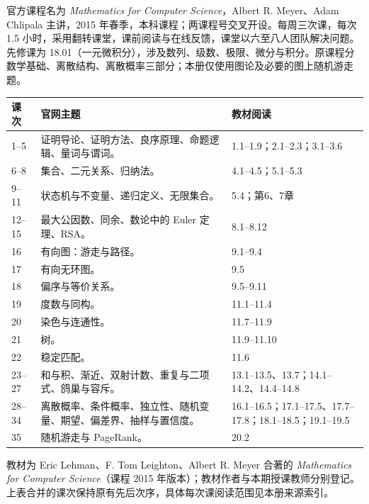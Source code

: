 \par\addvspace{9pt}\par\nobreak\vspace{4pt}
官方课程名为 \textit{Mathematics for Computer Science}，Albert R. Meyer、Adam Chlipala 主讲，2015 年春季，本科课程；两课程号交叉开设。每周三次课，每次 1.5 小时，采用翻转课堂，课前阅读与在线反馈，课堂以六至八人团队解决问题。先修课为 18.01（一元微积分），涉及数列、级数、极限、微分与积分。原课程分数学基础、离散结构、离散概率三部分；本册仅使用图论及必要的图上随机游走题。
\begin{longtable}{p{}p{}p{}}
\toprule 课次 & 官网主题 & 教材阅读\\\midrule\endhead
1--5 & 证明导论、证明方法、良序原理、命题逻辑、量词与谓词。 & 1.1--1.9；2.1--2.3；3.1--3.6\\
6--8 & 集合、二元关系、归纳法。 & 4.1--4.5；5.1--5.3\\
9--11 & 状态机与不变量、递归定义、无限集合。 & 5.4；第6、7章\\
12--15 & 最大公因数、同余、数论中的 Euler 定理、RSA。 & 8.1--8.12\\
16 & 有向图：游走与路径。 & 9.1--9.4\\
17 & 有向无环图。 & 9.5\\
18 & 偏序与等价关系。 & 9.5--9.11\\
19 & 度数与同构。 & 11.1--11.4\\
20 & 染色与连通性。 & 11.7--11.9\\
21 & 树。 & 11.9--11.10\\
22 & 稳定匹配。 & 11.6\\
23--27 & 和与积、渐近、双射计数、重复与二项式、鸽巢与容斥。 & 13.1--13.5、13.7；14.1--14.2、14.4--14.8\\
28--34 & 离散概率、条件概率、独立性、随机变量、期望、偏差界、抽样与置信度。 & 16.1--16.5；17.1--17.5、17.7--17.8；18.1--18.5；19.1--19.5\\
35 & 随机游走与 PageRank。 & 20.2\\\bottomrule
\end{longtable}
教材为 Eric Lehman、F. Tom Leighton、Albert R. Meyer 合著的 \textit{Mathematics for Computer Science}（课程 2015 年版本）；教材作者与本期授课教师分别登记。上表合并的课次保持原有先后次序，具体每次课阅读范围见本册来源索引。

